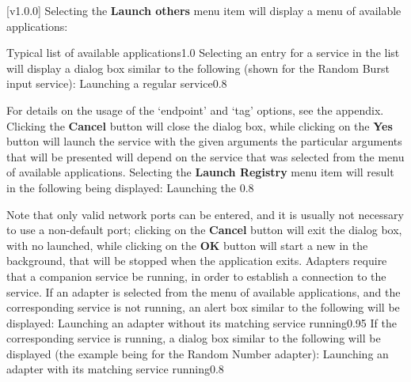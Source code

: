 [v1.0.0]
Selecting the \textbf{Launch others \textellipsis} menu item will display a menu of
available applications:

%
{Typical list of available applications}{1.0}
\condPage{}
Selecting an entry for a service in the list will display a dialog box similar to the
following (shown for the Random Burst input service):
%
{Launching a regular service}{0.8}

For details on the usage of the `endpoint' and `tag' options, see the 
 appendix.
Clicking the \textbf{Cancel} button will close the dialog box, while clicking on the
\textbf{Yes} button will launch the service with the given arguments \longDash{} the
particular arguments that will be presented will depend on the service that was selected
from the menu of available applications.
\secondaryEnd
\condPage
{}
Selecting the \textbf{Launch Registry} menu item will result in the following being
displayed:
%
{Launching the \emph{\RS}}{0.8}

Note that only valid network ports can be entered, and it is usually not necessary to use
a non-default port; clicking on the \textbf{Cancel} button will exit the dialog box, with
no \emph{\RS} launched, while clicking on the \textbf{OK} button will start a new
\emph{\RS} in the background, that will be stopped when the \emph{\CMU} application exits.
\secondaryEnd
{}
Adapters require that a companion service be running, in order to establish a connection
to the service.
If an adapter is selected from the menu of available applications, and the corresponding
service is not running, an alert box similar to the following will be displayed:
%
{Launching an adapter without its matching service running}{0.95}
\condPage{}
If the corresponding service is running, a dialog box similar to the following will be
displayed (the example being for the Random Number adapter):
%
{Launching an adapter with its matching service running}{0.8}

